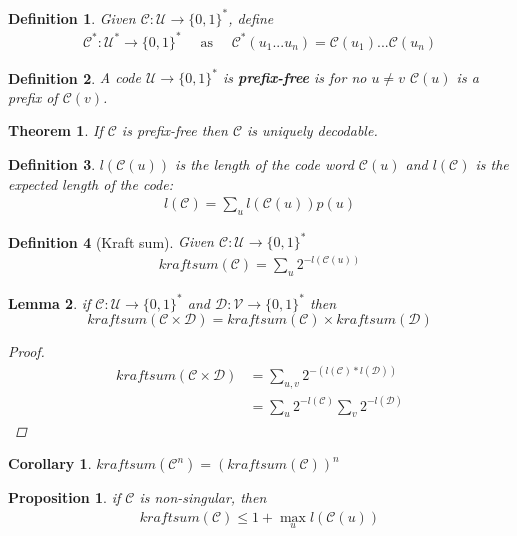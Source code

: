 \documentclass{article}
\newtheorem{theorem}{Theorem}[section]
\newtheorem{corollary}{Corollary}[theorem]
\newtheorem{lemma}[theorem]{Lemma}
\newtheorem{definition}{Definition}[section]
\newtheorem{proposition}{Proposition}[section]
\theoremstyle{definition} %
\def\D{\mathcal{D}}
\def\V{\mathcal{V}}
\def\U{\mathcal{U}}
\def\C{\mathscr{C}}
\begin{document}
\begin{definition}
	Given $\C : \U \rightarrow \{ 0, 1\}^*$, define
	\begin{align*}
		\C^* : \U^* \rightarrow \{0, 1\}^*
		\quad \text{ as } \quad
		\C^*(u_1 ... u_n) = \C(u_1)...\C(u_n)
	\end{align*}
\end{definition}

\begin{definition}
	A code $\U \rightarrow \{0, 1\}^*$ is \textbf{prefix-free} is for no $u \neq v$ $\C(u)$ is a prefix of $\C(v)$.
\end{definition}

\begin{theorem}
	If $\C$ is prefix-free then $\C$ is uniquely decodable.
\end{theorem}

\begin{definition}
  $l(\C(u))$ is the length of the code word $\C(u)$ and $l(\C)$ is the expected length of the code:
  \begin{align*}
    l(\C) = \sum_u l(\C(u)) p(u)
  \end{align*}
\end{definition}

\begin{definition}[Kraft sum]
  Given $\C : \U \rightarrow \{ 0, 1\}^*$
	\begin{align*}
		kraftsum(\C) = \sum_u 2^{-l(\C(u))}
	\end{align*}
\end{definition}

\begin{lemma}
	if $\C : \U \rightarrow \{ 0, 1\}^*$ and $\D : \V \rightarrow \{ 0, 1\}^*$
	then
  $$kraftsum(\C \times \D) = kraftsum(\C) \times kraftsum(\D)$$
	\begin{proof}
    \begin{align*}
      kraftsum(\C \times \D) &= \sum_{u, v} 2^{-(l(\C) * l(\D))} \\
      &= \sum_u 2^{-l(\C)} \sum_v 2^{- l(\D)}
    \end{align*}
	\end{proof}
\end{lemma}

\begin{corollary}
  $kraftsum(\C^n) = (kraftsum(\C))^n$
\end{corollary}

\begin{proposition}
  if $\C$ is non-singular, then
  \begin{align*}
    kraftsum(\C) \leq 1 + \max_u l(\C(u))
  \end{align*}
\end{proposition}
\end{document}
